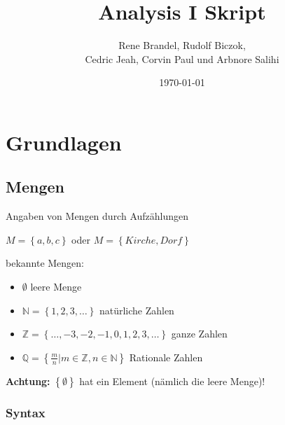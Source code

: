 \documentclass[fleqn]{scrbook}
\newcommand{\titleText}{Analysis I Skript}
\newcommand{\mainAuthor}{Rene Brandel, Rudolf Biczok, \texorpdfstring{\\}{} Cedric Jeah, Corvin Paul und Arbnore Salihi}
\begin{document}
\title{\titleText}
\date{\today}
\author{\mainAuthor}
\maketitle

\newpage
\tableofcontents
\newpage

\chapter{Grundlagen}

\section{Mengen}

Angaben von Mengen durch Aufzählungen

$M=\left\{ a,b,c \right\}$ oder $M=\left\{ Kirche, Dorf\right\}$

bekannte Mengen:
\begin{itemize}
  \item $\emptyset$ leere Menge
  \item $\mathbb{N} = \left\{ 1,2,3,\ldots \right\}$ natürliche Zahlen
  \item $\mathbb{Z} = \left\{ \ldots,-3,-2,-1,0,1,2,3,\ldots \right\}$ ganze Zahlen
  \item $\mathbb{Q} = \left\{ \frac{m}{n}|m \in \mathbb{Z},n \in \mathbb{N} \right\}$ Rationale Zahlen
\end{itemize}

\textbf{Achtung:} $\left\{ \emptyset \right\}$ hat ein Element (nämlich die leere Menge)!

\subsection{Syntax}
\end{document}

